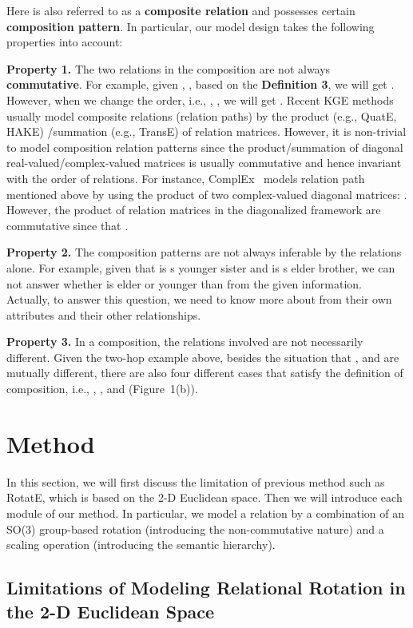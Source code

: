 \documentclass[11pt]{article}
\begin{document}
Here  is also referred to as a \textbf{composite relation} and possesses certain \textbf{composition pattern}. 
In particular, our model design takes the following properties into account:

\textbf{Property 1.} The two relations in the composition are not always \textbf{commutative}. For example, given , , based on the \textbf{Definition 3}, we will get . However, when we change the order, i.e., , , we will get . Recent KGE methods usually model composite relations (relation paths) by the product (e.g., QuatE, HAKE) /summation (e.g., TransE) of relation matrices. However, it is non-trivial to model composition relation patterns since the product/summation of diagonal real-valued/complex-valued matrices is usually commutative and hence invariant with the order of relations. For instance, ComplEx~\cite{trouillon2016complex} models relation path mentioned above  by using the product of two complex-valued diagonal matrices: . However, the product of relation matrices in the diagonalized framework are commutative since that .

\textbf{Property 2.} The composition patterns are not always inferable by the relations alone. For example, given that  is s younger sister and  is s elder brother, we can not answer whether  is elder or younger than  from the given information. Actually, to answer this question, we need to know more about  from their own attributes and their other relationships.

\textbf{Property 3.} In a composition, the relations involved are not necessarily different. Given the two-hop example above, besides the situation that ,  and  are mutually different, there are also four different cases that satisfy the definition of composition, i.e., , ,  and  (Figure~1(b)).

\section{Method}


In this section, we will first discuss the limitation of previous method such as RotatE, which is based on the 2-D Euclidean space. Then we will introduce each module of our method. In particular, we model a relation by a combination of an SO(3) group-based rotation (introducing the non-commutative nature) and a scaling operation (introducing the semantic hierarchy).

\subsection{Limitations of Modeling Relational Rotation in the 2-D Euclidean Space}
\end{document}
